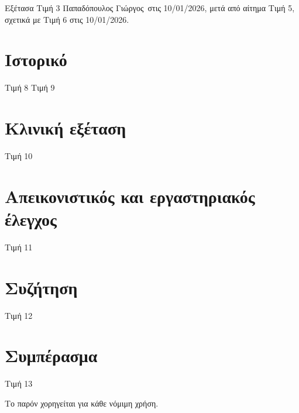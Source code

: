 \documentclass[10pt,greek]{article}
\providecommand\PatientName{Παπαδόπουλος Γιώργος}
\begin{document}
\begin{PatientInfo}
\end{PatientInfo}

Εξέτασα Τιμή 3 \PatientName\ στις 10/01/2026, μετά από αίτημα Τιμή 5, σχετικά με Τιμή 6 στις 10/01/2026.

\section*{Ιστορικό}
Τιμή 8
Τιμή 9

\section*{Κλινική εξέταση}
Τιμή 10

\section*{Απεικονιστικός και εργαστηριακός έλεγχος}
Τιμή 11

\section*{Συζήτηση}
Τιμή 12

\section*{Συμπέρασμα}
Τιμή 13

Το παρόν χορηγείται για κάθε νόμιμη χρήση.
\end{document}
